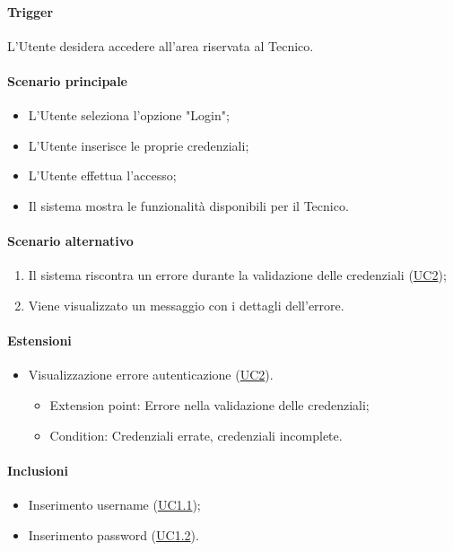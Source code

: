 \paragraph*{Trigger}
L'Utente desidera accedere all'area riservata al Tecnico.

\paragraph*{Scenario principale}
\begin{itemize}
  \item L'Utente seleziona l'opzione "Login";
  \item L'Utente inserisce le proprie credenziali;
  \item L'Utente effettua l'accesso;
  \item Il sistema mostra le funzionalità disponibili per il Tecnico.
\end{itemize}

\paragraph*{Scenario alternativo}
\begin{enumerate}
  \item Il sistema riscontra un errore durante la validazione delle credenziali (\hyperref[UC2]{UC2});
  \item Viene visualizzato un messaggio con i dettagli dell'errore.
\end{enumerate}

\paragraph*{Estensioni}
\begin{itemize}
  \item Visualizzazione errore autenticazione (\hyperref[UC2]{UC2}).
  \begin{itemize}
    \item Extension point: Errore nella validazione delle credenziali;
    \item Condition: Credenziali errate, credenziali incomplete.
  \end{itemize}
\end{itemize}

\paragraph*{Inclusioni}
\begin{itemize}
  \item Inserimento username (\hyperref[UC1point1]{UC1.1});
  \item Inserimento password (\hyperref[UC1point2]{UC1.2}).
\end{itemize}

